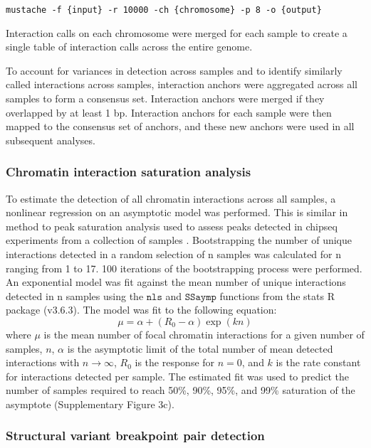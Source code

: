 \begin{lstlisting}[basicstyle=\ttfamily]
mustache -f {input} -r 10000 -ch {chromosome} -p 8 -o {output}
\end{lstlisting}

Interaction calls on each chromosome were merged for each sample to create a single table of interaction calls across the entire genome.

To account for variances in detection across samples and to identify similarly called interactions across samples, interaction anchors were aggregated across all samples to form a consensus set.
Interaction anchors were merged if they overlapped by at least 1 bp.
Interaction anchors for each sample were then mapped to the consensus set of anchors, and these new anchors were used in all subsequent analyses.

\subsubsection{Chromatin interaction saturation analysis}

To estimate the detection of all chromatin interactions across all samples, a nonlinear regression on an asymptotic model was performed.
This is similar in method to peak saturation analysis used to assess peaks detected in \gls{chipseq} experiments from a collection of samples \cite{kronTMPRSS2ERGFusion2017}.
Bootstrapping the number of unique interactions detected in a random selection of n samples was calculated for n ranging from 1 to 17.
100 iterations of the bootstrapping process were performed.
An exponential model was fit against the mean number of unique interactions detected in n samples using the $\texttt{nls}$ and $\texttt{SSaymp}$ functions from the stats R package (v3.6.3).
The model was fit to the following equation:
%
\begin{equation*}
  \mu = \alpha + \left( R_0 - \alpha \right) \exp \left(kn \right)
\end{equation*}
%
where $\mu$ is the mean number of focal chromatin interactions for a given number of samples, $n$, $\alpha$ is the asymptotic limit of the total number of mean detected interactions with $n \rightarrow \infty$, $R_0$ is the response for $n = 0$, and $k$ is the rate constant for interactions detected per sample.
The estimated fit was used to predict the number of samples required to reach 50\%, 90\%, 95\%, and 99\% saturation of the asymptote (Supplementary Figure 3c).

\subsubsection{Structural variant breakpoint pair detection}

